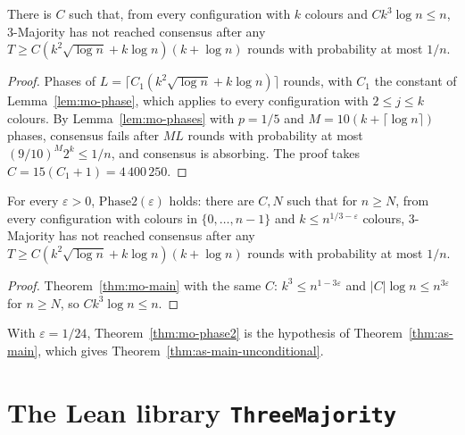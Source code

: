 \begin{theorem}\label{thm:mo-main}
\leanok
{}
There is $C$ such that, from every configuration with $k$ colours and $Ck^3\log n\le n$,
3-Majority has not reached consensus after any $T\ge C(k^2\sqrt{\log n}+k\log n)(k+\log n)$
rounds with probability at most $1/n$.
\end{theorem}
\begin{proof}\leanok
Phases of $L=\lceil C_1(k^2\sqrt{\log n}+k\log n)\rceil$ rounds, with $C_1$ the constant of
Lemma~\ref{lem:mo-phase}, which applies to every configuration with $2\le j\le k$ colours. By
Lemma~\ref{lem:mo-phases} with $p=1/5$ and $M=10(k+\lceil\log n\rceil)$ phases, consensus fails
after $ML$ rounds with probability at most $(9/10)^M2^k\le1/n$, and consensus is absorbing. The
proof takes $C=15(C_1+1)=4\,400\,250$.
\end{proof}

\begin{theorem}[Theorem~3.1]\label{thm:mo-phase2}
\leanok
{}
For every $\varepsilon>0$, $\mathrm{Phase2}(\varepsilon)$ holds: there are $C,N$ such that for
$n\ge N$, from every configuration with colours in $\{0,\dots,n-1\}$ and $k\le n^{1/3-\varepsilon}$
colours, 3-Majority has not reached consensus after any
$T\ge C(k^2\sqrt{\log n}+k\log n)(k+\log n)$ rounds with probability at most $1/n$.
\end{theorem}
\begin{proof}\leanok
Theorem~\ref{thm:mo-main} with the same $C$: $k^3\le n^{1-3\varepsilon}$ and
$|C|\log n\le n^{3\varepsilon}$ for $n\ge N$, so $Ck^3\log n\le n$.
\end{proof}

With $\varepsilon=1/24$, Theorem~\ref{thm:mo-phase2} is the hypothesis of
Theorem~\ref{thm:as-main}, which gives Theorem~\ref{thm:as-main-unconditional}.

\section{The Lean library \texttt{ThreeMajority}}\label{sec:lean}

